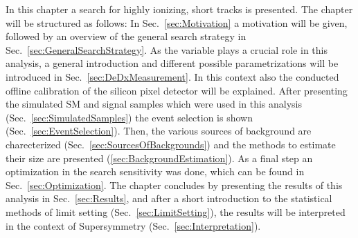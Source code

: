 In this chapter a search for highly ionizing, short tracks is presented. The chapter will be structured as follows:
In \mbox{Sec.~\ref{sec:Motivation}} a motivation will be given, followed by an overview of the general search strategy in \mbox{Sec.~\ref{sec:GeneralSearchStrategy}}.
As the variable \dedx plays a crucial role in this analysis, a general introduction and different possible parametrizations will be introduced in \mbox{Sec.~\ref{sec:DeDxMeasurement}}.
In this context also the conducted offline calibration of the silicon pixel detector will be explained.
After presenting the simulated SM and signal samples which were used in this analysis (\mbox{Sec.~\ref{sec:SimulatedSamples}}) the event selection is shown (Sec.~\ref{sec:EventSelection}).
Then, the various sources of background are charecterized (Sec.~\ref{sec:SourcesOfBackgrounds}) and the methods to estimate their size are presented (\ref{sec:BackgroundEstimation}).
As a final step an optimization in the search sensitivity was done, which can be found in Sec.~\ref{sec:Optimization}.
The chapter concludes by presenting the results of this analysis in Sec.~\ref{sec:Results}, and after a short introduction to the statistical methods of limit setting (Sec.~\ref{sec:LimitSetting}), the results will be interpreted in the context of Supersymmetry (Sec.~\ref{sec:Interpretation}).


